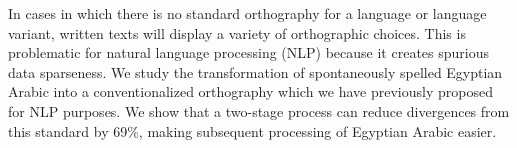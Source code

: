 In cases in which there is no standard orthography for a language or language variant, written texts will display a variety of orthographic choices. This is
 problematic for natural language processing (NLP) because it creates spurious
 data sparseness. We study the transformation of spontaneously spelled Egyptian
 Arabic into a conventionalized orthography which we have previously proposed
 for NLP purposes. We show that a two-stage process can reduce divergences from
 this standard by 69\%, making subsequent processing of Egyptian Arabic easier.

